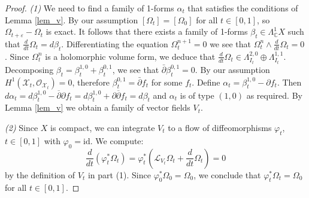 \documentclass[10pt,a4paper]{amsart}
\newcommand{\LL}{\mathcal{L}}
\newcommand{\OO}{\mathcal{O}}
\newcommand{\XX}{\mathcal{X}}
\newcommand{\bbC}{\mathbb{C}}
\newcommand{\ddb}{\overline\partial}
\newcommand{\dd}{\partial}
\begin{document}
\begin{proof}
{\it (1)} We need to find a family of 1-forms $\alpha_t$ that satisfies the
conditions of Lemma \ref{lem_v}. By our assumption $[\Omega_t] = [\Omega_0]$
for all $t\in [0,1]$, so $\Omega_{t+\varepsilon} - \Omega_t$ is exact. It follows that there
exists a family of 1-forms $\beta_t \in \Lambda^1_{\bbC}X$ such that $\frac{d}{dt}\Omega_t = d\beta_t$.
Differentiating the equation $\Omega_t^{n+1} = 0$ we see that $\Omega_t^n\wedge \frac{d}{dt}\Omega_t =0$.
Since $\Omega_t^n$ is a holomorphic volume form, we deduce that $\frac{d}{dt}\Omega_t \in \Lambda^{2,0}_{I_t}\oplus \Lambda^{1,1}_{I_t}$.
Decomposing $\beta_t = \beta_t^{1,0} + \beta_t^{0,1}$, we see that $\bar{\partial} \beta_t^{0,1} = 0$.
By our assumption $H^1(\XX_t,\OO_{\XX_t}) = 0$, therefore $\beta_t^{0,1} = \bar{\partial} f_t$ for
some $f_t$. Define $\alpha_t = \beta_t^{1,0} - \partial f_t$. Then
$d\alpha_t = d\beta_t^{1,0} - \ddb\dd f_t = d\beta_t^{1,0} + \dd \ddb f_t = d\beta_t$
and $\alpha_t$ is of type $(1,0)$ as required. By Lemma \ref{lem_v} we obtain
a family of vector fields $V_t$.

{\it (2)} %
Since $X$ is compact, we can integrate $V_t$ to a flow of diffeomorphisms $\varphi_t$, $t\in[0,1]$
with $\varphi_0 = \mathrm{id}$. We compute:
$$
\frac{d}{dt}(\varphi_t^*\Omega_t) = \varphi_t^*\left(\LL_{V_t}\Omega_t + \frac{d}{dt}\Omega_t\right) = 0
$$
by the definition of $V_t$ in part (1). Since $\varphi_0^*\Omega_0 = \Omega_0$,
we conclude that $\varphi_t^*\Omega_t = \Omega_0$ for all $t\in [0,1]$.
\end{proof}
\end{document}
